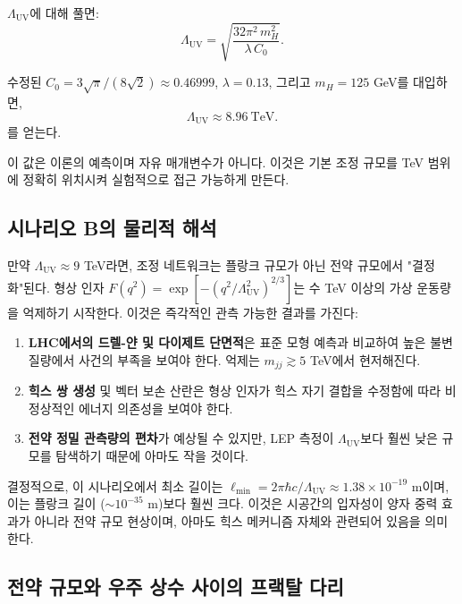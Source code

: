 \documentclass[11pt,a4paper]{article}
\newcommand{\Lmin}{\ell_{\min}}
\newcommand{\LUV}{\Lambda_{\mathrm{UV}}}
\theoremstyle{remark}
\begin{document}
	\(\LUV\)에 대해 풀면:
	\begin{equation}
		\LUV = \sqrt{\frac{32\pi^2\, m_H^2}{\lambda\, C_0}}.
		\label{eq:LUV_solve}
	\end{equation}
	
	수정된 \(C_0 = 3\sqrt{\pi}/(8\sqrt{2}) \approx 0.46999\), \(\lambda = 0.13\), 그리고 \(m_H = 125\) GeV를 대입하면,
	\begin{equation}
		\boxed{\LUV \approx 8.96\ \mathrm{TeV}}.
		\label{eq:LUV_TeV}
	\end{equation}
	를 얻는다.
	
	이 값은 이론의 예측이며 자유 매개변수가 아니다. 이것은 기본 조정 규모를 TeV 범위에 정확히 위치시켜 실험적으로 접근 가능하게 만든다.
	
	\subsection{시나리오 B의 물리적 해석}
	
	만약 \(\LUV \approx 9\) TeV라면, 조정 네트워크는 플랑크 규모가 아닌 전약 규모에서 "결정화"된다. 형상 인자 \(F(q^2) = \exp[-(q^2/\LUV^2)^{2/3}]\)는 수 TeV 이상의 가상 운동량을 억제하기 시작한다. 이것은 즉각적인 관측 가능한 결과를 가진다:
	
	\begin{enumerate}[label=(\arabic*)]
		\item \textbf{LHC에서의 드렐-얀 및 다이제트 단면적}은 표준 모형 예측과 비교하여 높은 불변 질량에서 사건의 부족을 보여야 한다. 억제는 \(m_{jj} \gtrsim 5\) TeV에서 현저해진다.
		\item \textbf{힉스 쌍 생성} 및 벡터 보손 산란은 형상 인자가 힉스 자기 결합을 수정함에 따라 비정상적인 에너지 의존성을 보여야 한다.
		\item \textbf{전약 정밀 관측량의 편차}가 예상될 수 있지만, LEP 측정이 \(\LUV\)보다 훨씬 낮은 규모를 탐색하기 때문에 아마도 작을 것이다.
	\end{enumerate}
	
	결정적으로, 이 시나리오에서 최소 길이는 \(\Lmin = 2\pi\hbar c/\LUV \approx 1.38\times 10^{-19}\) m이며, 이는 플랑크 길이 (\(\sim 10^{-35}\) m)보다 훨씬 크다. 이것은 시공간의 입자성이 양자 중력 효과가 아니라 전약 규모 현상이며, 아마도 힉스 메커니즘 자체와 관련되어 있음을 의미한다.
	
	\subsection{전약 규모와 우주 상수 사이의 프랙탈 다리}
	\label{subsec:bridge}
	
\end{document}
